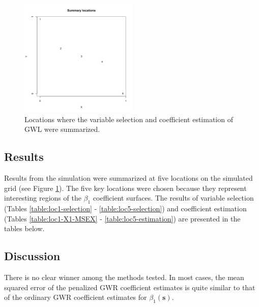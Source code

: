 \documentclass[authoryear, review, 11pt]{elsarticle}
\begin{document}
	\begin{figure}
		\begin{center}
			\includegraphics[width=0.5\textwidth]{../../figures/simulation/illustrations/summary-locations.pdf}
			\caption{Locations where the variable selection and coefficient estimation of GWL were summarized.\label{fig:summary-locations}}
		\end{center}
	\end{figure}
	
	\subsection{Results}
	Results from the simulation were summarized at five locations on the simulated grid (see Figure \ref{fig:summary-locations}). The five key locations were chosen because they represent interesting regions of the $\beta_1$ coefficient surfaces. The results of variable selection (Tables \ref{table:loc1-selection} - \ref{table:loc5-selection}) and coefficient estimation (Tables \ref{table:loc1-X1-MSEX} - \ref{table:loc5-estimation}) are presented in the tables below.
	
		
	\subsection{Discussion}
	There is no clear winner among the methods tested. In most cases, the mean squared error of the penalized GWR coefficient estimates is quite similar to that of the ordinary GWR coefficient estimates for $\beta_1(\bm{s})$. 
	
\end{document}
